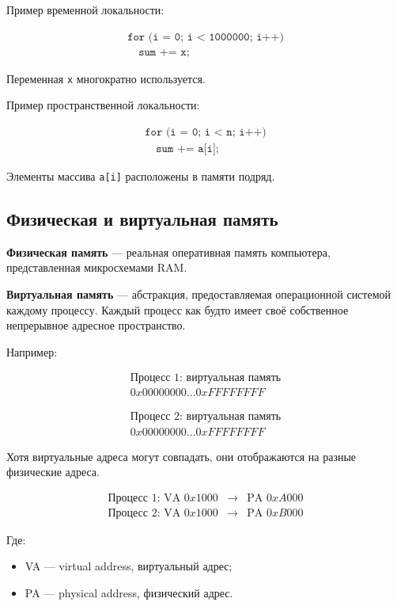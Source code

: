 \documentclass[12pt,a4paper]{article}
\theoremstyle{remark}
\begin{document}
Пример временной локальности:

\[
\begin{array}{l}
\texttt{for (i = 0; i < 1000000; i++)} \\
\quad \texttt{sum += x;}
\end{array}
\]

Переменная \texttt{x} многократно используется.

Пример пространственной локальности:

\[
\begin{array}{l}
\texttt{for (i = 0; i < n; i++)} \\
\quad \texttt{sum += a[i];}
\end{array}
\]

Элементы массива \texttt{a[i]} расположены в памяти подряд.

\subsection{Физическая и виртуальная память}

\textbf{Физическая память} --- реальная оперативная память компьютера, представленная микросхемами RAM.

\textbf{Виртуальная память} --- абстракция, предоставляемая операционной системой каждому процессу. Каждый процесс как будто имеет своё собственное непрерывное адресное пространство.

Например:

\[
\begin{array}{c}
\boxed{\text{Процесс 1: виртуальная память}} \\
0x00000000 \ldots 0xFFFFFFFF
\end{array}
\]

\[
\begin{array}{c}
\boxed{\text{Процесс 2: виртуальная память}} \\
0x00000000 \ldots 0xFFFFFFFF
\end{array}
\]

Хотя виртуальные адреса могут совпадать, они отображаются на разные физические адреса.

\[
\begin{array}{ccc}
\text{Процесс 1: VA } 0x1000 & \longrightarrow & \text{PA } 0xA000 \\
\text{Процесс 2: VA } 0x1000 & \longrightarrow & \text{PA } 0xB000
\end{array}
\]

Где:
\begin{itemize}
    \item VA --- virtual address, виртуальный адрес;
    \item PA --- physical address, физический адрес.
\end{itemize}
\end{document}
